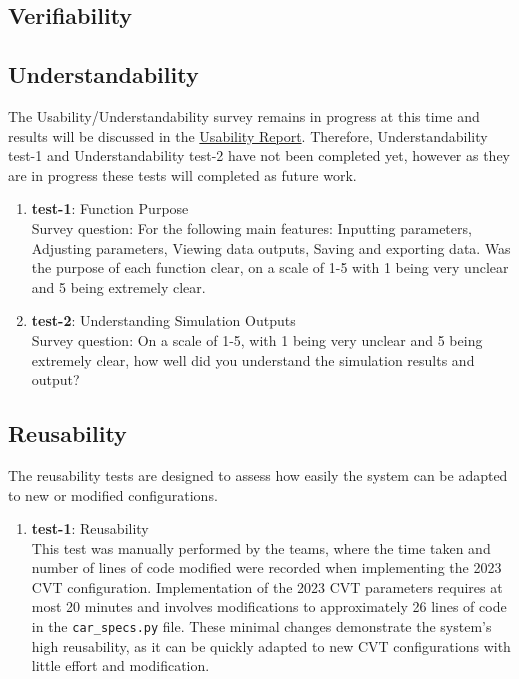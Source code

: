 \documentclass[12pt, titlepage]{article}
\begin{document}
\subsection{Verifiability}

\subsection{Understandability}
The Usability/Understandability survey remains in progress at this time and results will be discussed in the \href{file:../UsabilityReport/UsabilityReport.pdf}{Usability Report}. 
Therefore, Understandability test-1 and Understandability test-2 have not been completed yet, however as they are in progress these tests will completed as future work. 

\begin{enumerate}
  \item{\textbf{test-1}: Function Purpose}\\
  Survey question: For the following main features: Inputting parameters, Adjusting parameters, Viewing data outputs, Saving and exporting data. 
  Was the purpose of each function clear, on a scale of 1-5 with 1 being very unclear and 5 being extremely clear. 
  \item{\textbf{test-2}: Understanding Simulation Outputs}\\
  Survey question: On a scale of 1-5, with 1 being very unclear and 5 being extremely clear, how well did you understand the simulation results and output?
\end{enumerate}

\subsection{Reusability}

The reusability tests are designed to assess how easily the system can be adapted to new or modified configurations. 
\begin{enumerate}
    \item {\textbf{test-1}: Reusability}\\
    This test was manually performed by the teams, where the time taken and number of lines of code modified were recorded when implementing the 2023 CVT configuration. 
    Implementation of the 2023 CVT parameters requires at most 20 minutes and involves modifications to approximately 26 lines of code in the \texttt{car\_specs.py} file. 
    These minimal changes demonstrate the system's high reusability, as it can be quickly adapted to new CVT configurations with little effort and modification.
\end{enumerate}
	
\end{document}
